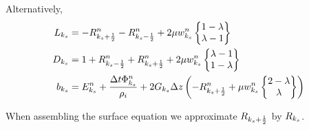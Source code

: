 \documentclass{article}
\begin{document}
\renewcommand{\Rp}{R^{n}_{\ks+\frac{1}{2}}}
\renewcommand{\Rm}{R^{n}_{\ks-\frac{1}{2}}}
\renewcommand{\W}{w^{n}_{\ks}}

Alternatively,
\begin{align}
  L_{\ks} &= -\Rp -\Rm + 2\mu\W \wstack{1 - \lambda}{\lambda - 1}\\
  D_{\ks} &= 1 + \Rm + \Rp + 2\mu\W \wstack{\lambda - 1}{1 - \lambda}\\
  b_{\ks} &= \rhs{\ks} + 2G_{\ks}\Delta z\left( -\Rp + \mu\W\wstack{2-\lambda}{\lambda} \right)
\end{align}

When assembling the surface equation we approximate $R_{k_{s} + \frac{1}{2}}$ by $R_{k_{s}}$.
\end{document}
